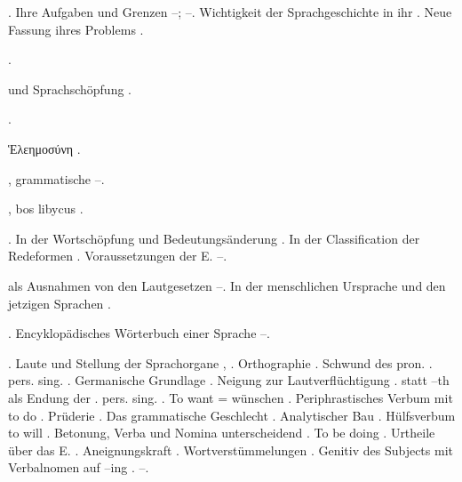 \begin{register}
. Ihre Aufgaben und Grenzen \pageref{sp.8}–\pageref{sp.9}; \pageref{sp.58}–\pageref{sp.61}. Wichtigkeit der Sprachgeschichte in ihr \pageref{sp.60}.  Neue Fassung ihres Problems \pageref{sp.209}.

 \pageref{sp.325}.

 und Sprachschöpfung \sed{\pageref{sp.245},} \pageref{sp.309}.

 \pageref{sp.114}.

Ἑλεημοσύνη \pageref{sp.231}.

, grammatische \pageref{sp.108}–\pageref{sp.109}.


, bos libycus \pageref{sp.41}.

 \pageref{sp.101}. In der Wortschöpfung und Bedeutungsänderung \pageref{sp.238}. In der Classification der Redeformen \pageref{sp.321}. Voraussetzungen der E. \pageref{sp.367}–\pageref{sp.368}.


 als Ausnahmen von den Lautgesetzen \pageref{sp.208}–\pageref{sp.209}. In der menschlichen Ursprache und den jetzigen Sprachen \pageref{sp.365}.


. Encyklopädisches Wörterbuch einer Sprache \pageref{sp.123}–\pageref{sp.124}.

. Laute und Stellung der Sprachorgane \pageref{sp.34}, \pageref{sp.36}. Orthographie \pageref{sp.133}. Schwund des pron. \pageref{sp.2}. pers. sing. \pageref{sp.152}. Germanische Grundlage \pageref{sp.158}. Neigung zur Lautverflüchtigung \pageref{sp.207}.  statt –th als Endung der \pageref{sp.3}. pers. sing. \pageref{sp.213}. To want = wünschen \pageref{sp.222}. Periphrastisches Verbum mit to do \pageref{sp.239}. Prüderie \pageref{sp.249}. Das grammatische Geschlecht \pageref{sp.254}. Analytischer Bau \pageref{sp.257}. Hülfsverbum to will \pageref{sp.316}.  Betonung, Verba und Nomina unterscheidend \pageref{sp.379}. To be doing \pageref{sp.384}. Urtheile über das E. \pageref{sp.393}. Aneignungskraft \pageref{sp.429}.  Wortverstümmelungen \pageref{sp.433}. Genitiv des Subjects mit Verbalnomen auf –ing \pageref{sp.467}.  \pageref{sp.474}–\pageref{sp.475}.


\end{register}
